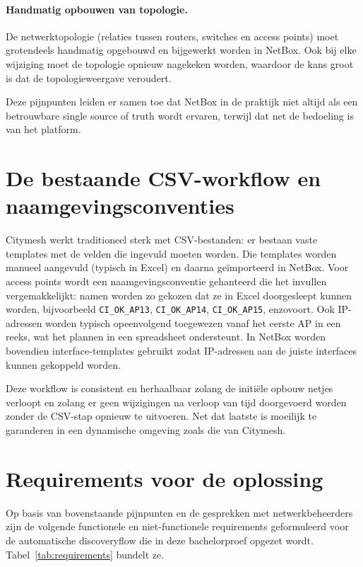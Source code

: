 \paragraph{Handmatig opbouwen van topologie.} De netwerktopologie (relaties tussen routers, switches en access points) moet grotendeels handmatig opgebouwd en bijgewerkt worden in NetBox. Ook bij elke wijziging moet de topologie opnieuw nagekeken worden, waardoor de kans groot is dat de topologieweergave veroudert.

Deze pijnpunten leiden er samen toe dat NetBox in de praktijk niet altijd als een betrouwbare single source of truth wordt ervaren, terwijl dat net de bedoeling is van het platform.

\section{De bestaande CSV-workflow en naamgevings\-conventies}

Citymesh werkt traditioneel sterk met CSV-bestanden: er bestaan vaste templates met de velden die ingevuld moeten worden. Die templates worden manueel aangevuld (typisch in Excel) en daarna geïmporteerd in NetBox. Voor access points wordt een naamgevingsconventie gehanteerd die het invullen vergemakkelijkt: namen worden zo gekozen dat ze in Excel doorgesleept kunnen worden, bijvoorbeeld \texttt{CI\_OK\_AP13}, \texttt{CI\_OK\_AP14}, \texttt{CI\_OK\_AP15}, enzovoort. Ook IP-adressen worden typisch opeenvolgend toegewezen vanaf het eerste AP in een reeks, wat het plannen in een spreadsheet ondersteunt. In NetBox worden bovendien interface-templates gebruikt zodat IP-adressen aan de juiste interfaces kunnen gekoppeld worden.

Deze workflow is consistent en herhaalbaar zolang de initiële opbouw netjes verloopt en zolang er geen wijzigingen na verloop van tijd doorgevoerd worden zonder de CSV-stap opnieuw te uitvoeren. Net dat laatste is moeilijk te garanderen in een dynamische omgeving zoals die van Citymesh.

\section{Requirements voor de oplossing}

Op basis van bovenstaande pijnpunten en de gesprekken met netwerkbeheerders zijn de volgende functionele en niet-functionele requirements geformuleerd voor de automatische discoveryflow die in deze bachelorproef opgezet wordt. Tabel~\ref{tab:requirements} bundelt ze.

